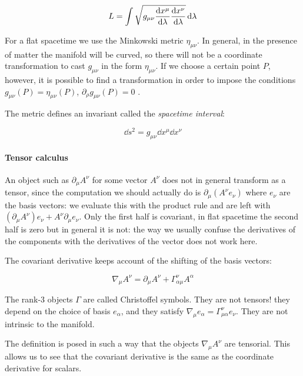 \documentclass[main.tex]{subfiles}
\begin{document}
\begin{equation}
    L = \int \sqrt{g_{\mu\nu} \dv{x^\mu}{\lambda} \dv{x^\nu}{\lambda} }  \dd{\lambda}
\end{equation}

For a flat spacetime we use the Minkowski metric \(\eta_{\mu\nu}\). In general, in the presence of matter the manifold will be curved, so there will not be a coordinate transformation to cast \(g_{\mu\nu}\) in the form \(\eta_{\mu\nu}\). If we choose a certain point \(P\), however, it is possible to find a transformation in order to impose the conditions \(g_{\mu\nu}(P)=\eta_{\mu\nu}(P)\), \(\partial_\rho g_{\mu\nu}(P) = 0\) \cite[pages 49--50]{Carroll:1997ar}.

The metric defines an invariant called the \emph{spacetime interval}:

\begin{equation}
  \dd{s}^2 = g_{\mu\nu} \dd{x^\mu}\dd{x^\nu}
\end{equation}

\paragraph{Tensor calculus}

An object such as \(\partial_\mu A^\nu\) for some vector \(A^\nu\) does not in general transform as a tensor, since the computation we should actually do is \(\partial_\mu (A^\nu e_\nu)\) where \(e_\nu\) are the basis vectors: we evaluate this with the product rule and are left with \((\partial_\mu A^\nu)e_\nu + A^\nu \partial_\mu e_\nu\). Only the first half is covariant, in flat spacetime the second half is zero but in general it is not: the way we usually confuse the derivatives of the components with the derivatives of the vector does not work here.

The covariant derivative keeps account of the shifting of the basis vectors:

\begin{equation}
    \nabla_\mu A^\nu = \partial_\mu A^\nu + \Gamma^\nu _{\alpha \mu}  A^\alpha
\end{equation}

The rank-3 objects $\Gamma$ are called Christoffel symbols. They are not tensors! they depend on the choice of basis $e_\alpha$, and they satisfy $\nabla _\mu e_\alpha = \Gamma ^\nu _{\mu \alpha} e_\nu$. They are not intrinsic to the manifold.

The definition is posed in such a way that the objects \(\nabla_\mu A^\nu\) are tensorial. This allows us to see that the covariant derivative is the same as the coordinate derivative for scalars.
\end{document}

